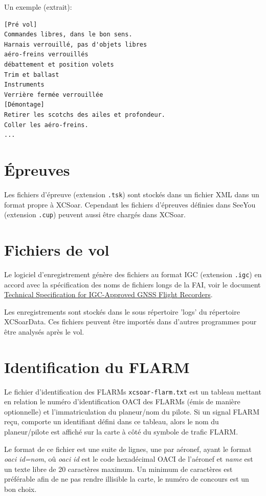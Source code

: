 Un exemple (extrait):
\begin{verbatim}
[Pré vol]
Commandes libres, dans le bon sens.
Harnais verrouillé, pas d'objets libres
aéro-freins verrouillés
débattement et position volets
Trim et ballast
Instruments
Verrière fermée verrouillée
[Démontage]
Retirer les scotchs des ailes et profondeur.
Coller les aéro-freins.
...
\end{verbatim}

\section{Épreuves}

Les fichiers d'épreuve (extension \verb|.tsk|) sont stockés dans un fichier XML dans un format propre à XCSoar. Cependant les fichiers d'épreuves définies dans SeeYou  (extension \verb|.cup|) peuvent aussi être chargés dans XCSoar.


\section{Fichiers de vol} \label{sec:logfiles}

Le logiciel d'enregistrement génère des fichiers au format IGC  (extension \verb|.igc|) en accord avec la spécification des noms de fichiers longs de la FAI, voir le document  {\href{http://www.fai.org/component/phocadownload/category/855-technicalspecifications?download=5745:igc-flight-recorder-specification-edition-2-with-al1-2011-5-31}{Technical Specification for IGC-Approved GNSS Flight Recorders}}.
 
Les enregistrements sont stockés dans le sous répertoire 'logs'  du répertoire XCSoarData. Ces fichiers peuvent être importés dans d'autres programmes pour être analysés après le vol.


\section{Identification du FLARM}\label{sec:flarm-ident-file}

Le fichier d'identification des FLARMs \verb|xcsoar-flarm.txt| est un tableau mettant en relation le numéro d'identification OACI des FLARMs (émis de manière optionnelle) et l'immatriculation du planeur/nom du pilote. Si un signal FLARM reçu, comporte un identifiant défini dans ce tableau, alors le nom du planeur/pilote est affiché sur la carte à côté du symbole de trafic FLARM.

Le format de ce fichier est une suite de lignes, une par aéronef, ayant le format  {\em oaci id=nom}, oû {\em oaci id} est le code hexadécimal OACI de l'aéronef et {\em name} est un texte libre de 20 caractères maximum. Un minimum de caractères est préférable afin de ne pas rendre illisible la carte, le numéro de concours est un bon choix.


